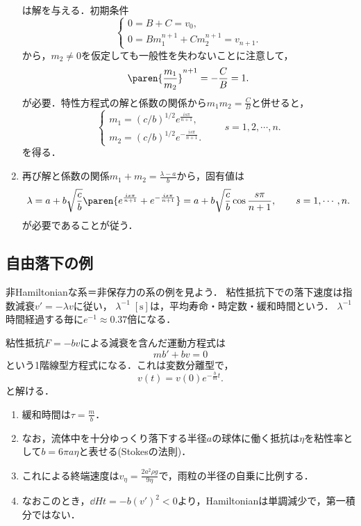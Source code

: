 \documentclass[uplatex,dvipdfmx]{jsreport}
\begin{document}
\begin{Proof}
\begin{enumerate}[{Step}1]
        は解を与える．初期条件
        \[\begin{cases}
            0=B+C=v_0,\\
            0=Bm_1^{n+1}+Cm_2^{n+1}=v_{n+1}.
        \end{cases}\]
        から，$m_2\ne0$を仮定しても一般性を失わないことに注意して，
        \[\paren{\frac{m_1}{m_2}}^{n+1}=-\frac{C}{B}=1.\]
        が必要．特性方程式の解と係数の関係から$m_1m_2=\frac{C}{B}$と併せると，
        \[\begin{cases}
            m_1=(c/b)^{1/2}e^{\frac{is\pi}{n+1}},\\
            m_2=(c/b)^{1/2}e^{-\frac{is\pi}{n+1}}.
        \end{cases}\qquad s=1,2,\cdots,n.\]
        を得る．
        \item 再び解と係数の関係$m_1+m_2=\frac{\lambda-a}{b}$から，固有値は
        \[\lambda=a+b\sqrt{\frac{c}{b}}\paren{e^{\frac{is\pi}{n+1}}+e^{-\frac{is\pi}{n+1}}}=a+b\sqrt{\frac{c}{b}}\cos\frac{s\pi}{n+1},\qquad s=1,\cdots,n.\]
        が必要であることが従う．
    \end{enumerate}
\end{Proof}

\subsection{自由落下の例}

\begin{tcolorbox}[colframe=ForestGreen, colback=ForestGreen!10!white,breakable,colbacktitle=ForestGreen!40!white,coltitle=black,fonttitle=\bfseries\sffamily,
title=]
    非Hamiltonianな系＝非保存力の系の例を見よう．
    粘性抵抗下での落下速度は指数減衰$v'=-\lambda v$に従い，
    $\lambda^{-1}\;[\si{\second}]$は，平均寿命・時定数・緩和時間という．
    $\lambda^{-1}$時間経過する毎に$e^{-1}\approx0.37$倍になる．
\end{tcolorbox}

\begin{model}
    粘性抵抗$F=-bv$による減衰を含んだ運動方程式は
    \[mb'+bv=0\]
    という1階線型方程式になる．これは変数分離型で，
    \[v(t)=v(0)e^{-\frac{b}{m}t}.\]
    と解ける．
    \begin{enumerate}
        \item 緩和時間は$\tau=\frac{m}{b}$．
        \item なお，流体中を十分ゆっくり落下する半径$a$の球体に働く抵抗は$\eta$を粘性率として$b=6\pi a\eta$と表せる(Stokesの法則)．
        \item これによる終端速度は$v_\eta=\frac{2a^2\rho g}{9\eta}$で，雨粒の半径の自乗に比例する．
        \item なおこのとき，$\dd{H}{t}=-b(v')^2<0$より，Hamiltonianは単調減少で，第一積分ではない．
    \end{enumerate}
\end{model}
\end{document}
